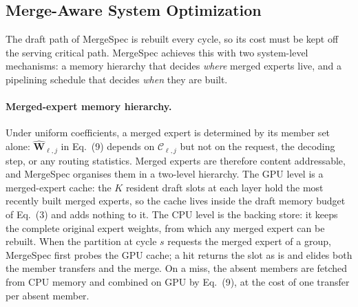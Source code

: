 %
%
%

\subsection{Merge-Aware System Optimization}

The draft path of MergeSpec is rebuilt every cycle, so its cost must be
kept off the serving critical path. MergeSpec achieves this with two
system-level mechanisms: a memory hierarchy that decides \emph{where}
merged experts live, and a pipelining schedule that decides \emph{when}
they are built.

\paragraph{Merged-expert memory hierarchy.}
Under uniform coefficients, a merged expert is determined by its member
set alone: $\widehat{\mathbf{W}}_{\ell,j}$ in Eq.~(9) depends on
$\mathcal{C}_{\ell,j}$ but not on the request, the decoding step, or any
routing statistics. Merged experts are therefore content addressable,
and MergeSpec organises them in a two-level hierarchy. The GPU level is
a merged-expert cache: the $K$ resident draft slots at each layer hold
the most recently built merged experts, so the cache lives inside the
draft memory budget of Eq.~(3) and adds nothing to it. The CPU level is
the backing store: it keeps the complete original expert weights, from
which any merged expert can be rebuilt. When the partition at cycle $s$
requests the merged expert of a group, MergeSpec first probes the GPU
cache; a hit returns the slot as is and elides both the member transfers
and the merge. On a miss, the absent members are fetched from CPU
memory and combined on GPU by Eq.~(9), at the cost of one transfer per
absent member.

